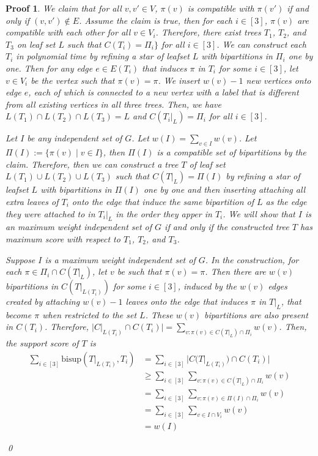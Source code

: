 \documentclass[twocolumn]{bmcart}%
\newcommand{\bs}{\mathrm{bisup}}
\theoremstyle{mystyle}
\theoremstyle{proofstyle}
\newtheorem*{proof2}{Proof}
\newenvironment{proofnospace}{\begin{proof2}}{\qed \end{proof2}}
\begin{document}
\begin{proofnospace}
  We claim that for all $v,v' \in V$, $\pi(v)$ is compatible with $\pi(v')$ if and only if $(v,v') \notin E$. Assume the claim is true, then for each $i \in [3]$, $\pi(v)$ are compatible with each other for all $v \in V_i$. Therefore, there exist trees $T_1$, $T_2$, and $T_3$ on leaf set $L$ such that $C(T_i) = \Pi_i\}$ for all $i \in [3]$. We can construct each $T_i$ in polynomial time by refining a star of leafset $L$ with bipartitions in $\Pi_i$ one by one. Then for any edge $e \in E(T_i)$ that induces $\pi$ in $T_i$ for some $i \in [3]$, let $v \in V_i$ be the vertex such that $\pi(v) = \pi$. We insert $w(v)-1$ new vertices onto edge $e$, each of which is connected to a new vertex with a label that is different from all existing vertices in all three trees. Then, we have $L(T_1) \cap L(T_2) \cap L(T_3) = L$ and $C(T_i|_L) = \Pi_i$ for all $i \in [3]$.
  
  Let $I$ be any independent set of $G$. Let $w(I) = \sum_{v \in I} w(v)$. Let $\Pi(I) := \{\pi(v) \mid v \in I\}$, then $\Pi(I)$ is a compatible set of bipartitions by the claim. Therefore, then we can construct a tree $T$ of leaf set $L(T_1) \cup L(T_2) \cup L(T_3)$ such that $C(T|_L) = \Pi(I)$ by refining a star of leafset $L$ with bipartitions in $\Pi(I)$ one by one and then inserting attaching all extra leaves of $T_i$ onto the edge that induce the same bipartition of $L$ as the edge they were attached to in $T_i|_L$ in the order they apper in $T_i$. We will show that $I$ is an maximum weight independent set of $G$ if and only if the constructed tree $T$ has maximum score with respect to $T_1$, $T_2$, and $T_3$.

  Suppose $I$ is a maximum weight independent set of $G$. In the construction, for each $\pi \in \Pi_i \cap C(T|_L)$, let $v$ be such that $\pi(v) = \pi$. Then there are $w(v)$ bipartitions in $C(T|_{L(T_i)})$ for some $i \in [3]$, induced by the $w(v)$ edges created by attaching $w(v)-1$ leaves onto the edge that induces $\pi$ in $T|_L$, that become $\pi$ when restricted to the set $L$. These $w(v)$ bipartitions are also present in $C(T_i)$. Therefore, $|C|_{L(T_i)} \cap C(T_i)| = \sum_{v: \pi(v) \in C(T|_L)\cap \Pi_i} w(v)$. Then, the support score of $T$ is
  \begin{align*}
    \sum_{i \in [3]}\bs(T|_{L(T_i)}, T_i) &= \sum_{i \in [3]}|C(T|_{L(T_i)}) \cap C(T_i)| \\
    &\ge \sum_{i \in [3]} \sum_{v: \pi(v) \in C(T|_L)\cap \Pi_i} w(v) \\
    &= \sum_{i \in [3]} \sum_{v: \pi(v) \in \Pi(I) \cap \Pi_i} w(v) \\
    &= \sum_{i \in [3]} \sum_{v \in I \cap V_i} w(v) \\
    &= w(I)
  \end{align*}



\end{proofnospace}
\end{document}
